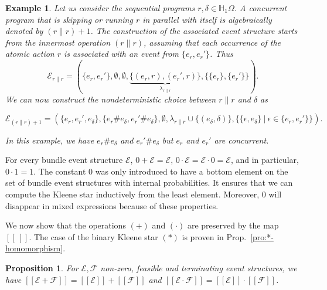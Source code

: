 \documentclass[review]{elsart}
\newtheorem{proposition}[definition]{Proposition}
\newtheorem{example}[definition]{Example}
\renewcommand{\H}{\mathbb{H}}
\newcommand{\EE}{\mathcal{E}}
\newcommand{\FF}{\mathcal{F}}
\newcommand{\sem}[1]{[\![#1]\!]}
\newcommand{\bks}{*}
\newcommand{\Prop}[1]{Prop.~\ref{#1}}
\begin{document}
\begin{example}
Let us consider the sequential programs $r,\delta{\in}\H_1\Omega$. A concurrent program that is skipping or running $r$ in parallel with itself is algebraically denoted by $(r\|r){+}1$. The construction of the associated event structure starts from the innermost operation $(r\|r)$, assuming that each occurrence of the atomic action $r$ is associated with an event from $\{e_r,e_r'\}$. Thus 
\[
	\EE_{r\|r} = (\{e_r,e_r'\}, \emptyset, \emptyset,\underbrace{\{(e_r,r),(e_r',r)\}}_{\lambda_{r\|r}}, \{\{e_r\},\{e_r'\}\}).
\]
We can now construct the nondeterministic choice between $r\|r$ and $\delta$ as
\begin{footnotesize}
\[
	\EE_{(r\|r){+}1} = (\{e_r,e_r',e_\delta\}, \{e_r\#e_\delta,e_r'\#e_\delta\},\emptyset,\lambda_{r\|r}{\cup}\{(e_\delta,\delta)\}, \{\{\epsilon,e_\delta\}\ |\ \epsilon{\in}\{e_r,e_r'\}\}).
\]
\end{footnotesize}
In this example, we have $e_r\#e_\delta$ and $e_r'\#e_\delta$ but $e_r$ and $e_r'$ are concurrent.
\end{example}

For every bundle event structure $\EE$, $0 {+} \EE {=} \EE$, $0{\cdot} \EE {=} \EE{\cdot} 0 {=} \EE$, and in particular, $0{\cdot} 1 {=} 1$. The constant $0$ was only introduced to have a bottom element on the set of bundle event structures with internal probabilities. It ensures that we can compute the Kleene star inductively from the least element. Moreover, $0$ will disappear in mixed expressions because of these properties.

We now show that the operations $(+)$ and $(\cdot)$ are preserved by the map $\sem{\ }$. The case of the binary Kleene star $({\bks})$ is proven in \Prop{pro:*-homomorphism}.

\begin{proposition}\label{pro:homomorphism}
For $\EE,\FF$ non-zero, feasible and terminating event structures, we have $\sem{\EE{+}\FF} = \sem{\EE}{+}\sem{\FF}$ and $\sem{\EE{\cdot}\FF} = \sem{\EE}{\cdot}\sem{\FF}$.
\end{proposition}
\end{document}
